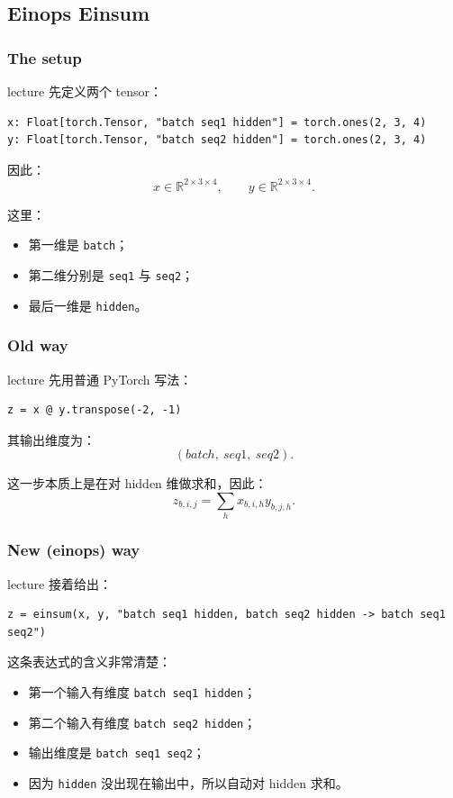 \documentclass[a4paper,UTF8]{article}
\numberwithin{equation}{section}
\begin{document}
\subsection{Einops Einsum}

\subsubsection{The setup}

lecture 先定义两个 tensor：
\begin{verbatim}
x: Float[torch.Tensor, "batch seq1 hidden"] = torch.ones(2, 3, 4)
y: Float[torch.Tensor, "batch seq2 hidden"] = torch.ones(2, 3, 4)
\end{verbatim}

因此：
\[
x \in \mathbb{R}^{2 \times 3 \times 4},\qquad
y \in \mathbb{R}^{2 \times 3 \times 4}.
\]

这里：
\begin{itemize}
    \item 第一维是 \verb|batch|；
    \item 第二维分别是 \verb|seq1| 与 \verb|seq2|；
    \item 最后一维是 \verb|hidden|。
\end{itemize}

\subsubsection{Old way}

lecture 先用普通 PyTorch 写法：
\begin{verbatim}
z = x @ y.transpose(-2, -1)
\end{verbatim}

其输出维度为：
\[
(batch,\ seq1,\ seq2).
\]

这一步本质上是在对 hidden 维做求和，因此：
\[
z_{b,i,j} = \sum_h x_{b,i,h} y_{b,j,h}.
\]

\subsubsection{New (einops) way}

lecture 接着给出：
\begin{verbatim}
z = einsum(x, y, "batch seq1 hidden, batch seq2 hidden -> batch seq1 seq2")
\end{verbatim}

这条表达式的含义非常清楚：
\begin{itemize}
    \item 第一个输入有维度 \verb|batch seq1 hidden|；
    \item 第二个输入有维度 \verb|batch seq2 hidden|；
    \item 输出维度是 \verb|batch seq1 seq2|；
    \item 因为 \verb|hidden| 没出现在输出中，所以自动对 hidden 求和。
\end{itemize}
\end{document}
